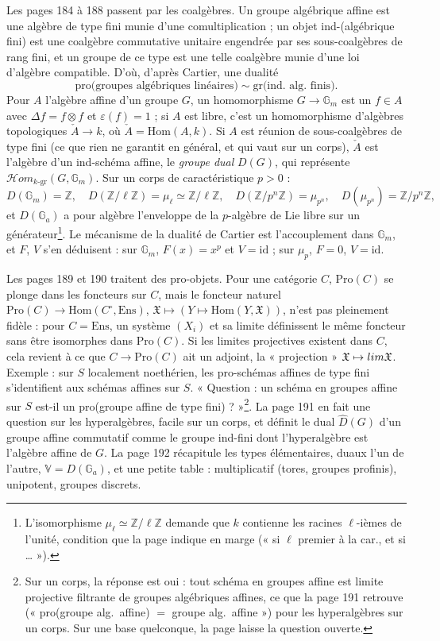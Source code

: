 \documentclass[11pt,a4paper]{article}
\begin{document}
Les pages 184 à 188 passent par les coalgèbres. Un groupe algébrique affine est
une algèbre de type fini munie d'une comultiplication ; un objet ind-(algébrique
fini) est une coalgèbre commutative unitaire engendrée par ses sous-coalgèbres de
rang fini, et un groupe de ce type est une telle coalgèbre munie d'une loi
d'algèbre compatible. D'où, d'après Cartier, une dualité
\[
\text{pro(groupes algébriques linéaires)} \sim \text{gr(ind.\ alg.\ finis)}.
\]
Pour $A$ l'algèbre affine d'un groupe $G$, un homomorphisme $G \to \mathbb{G}_m$ est un
$f \in A$ avec $\Delta f = f \otimes f$ et $\varepsilon(f) = 1$ ; si $A$ est libre,
c'est un homomorphisme d'algèbres topologiques $\check A \to k$, où $\check A =
\mathrm{Hom}(A, k)$. Si $A$ est réunion de sous-coalgèbres de type fini (ce que
rien ne garantit en général, et qui vaut sur un corps), $\check A$ est l'algèbre
d'un ind-schéma affine, le \emph{groupe dual} $D(G)$, qui représente
$\mathcal{H}om_{k\text{-gr}}(G, \mathbb{G}_m)$. Sur un corps de caractéristique
$p > 0$ :
\[
D(\mathbb{G}_m) = \mathbb{Z},\quad D(\mathbb{Z}/\ell\mathbb{Z}) = \mu_\ell \simeq
\mathbb{Z}/\ell\mathbb{Z},\quad D(\mathbb{Z}/p^n\mathbb{Z}) = \mu_{p^n},\quad
D(\mu_{p^n}) = \mathbb{Z}/p^n\mathbb{Z},
\]
et $D(\mathbb{G}_a)$ a pour algèbre l'enveloppe de la $p$-algèbre de Lie libre sur
un générateur\footnote{L'isomorphisme $\mu_\ell \simeq \mathbb{Z}/\ell\mathbb{Z}$
demande que $k$ contienne les racines $\ell$-ièmes de l'unité, condition que la
page indique en marge (« si $\ell$ premier à la car., et si … »).}. Le mécanisme de
la dualité de Cartier est l'accouplement dans $\mathbb{G}_m$, et $F$, $V$ s'en
déduisent : sur $\mathbb{G}_m$, $F(x) = x^p$ et $V = \mathrm{id}$ ; sur $\mu_p$,
$F = 0$, $V = \mathrm{id}$.

Les pages 189 et 190 traitent des pro-objets. Pour une catégorie $C$,
$\mathrm{Pro}(C)$ se plonge dans les foncteurs sur $C$, mais le foncteur naturel
$\mathrm{Pro}(C) \to \mathrm{Hom}(C^{\circ}, \mathrm{Ens})$, $\mathfrak{X} \mapsto
(Y \mapsto \mathrm{Hom}(Y, \mathfrak{X}))$, n'est pas pleinement fidèle : pour $C =
\mathrm{Ens}$, un système $(X_i)$ et sa limite définissent le même foncteur sans
être isomorphes dans $\mathrm{Pro}(C)$. Si les limites projectives existent dans
$C$, cela revient à ce que $C \to \mathrm{Pro}(C)$ ait un adjoint, la
« projection » $\mathfrak{X} \mapsto \varprojlim \mathfrak{X}$. Exemple : sur $S$
localement noethérien, les pro-schémas affines de type fini s'identifient aux
schémas affines sur $S$. « Question : un schéma en groupes affine sur $S$ est-il
un pro(groupe affine de type fini) ? »\footnote{Sur un corps, la réponse est oui :
tout schéma en groupes affine est limite projective filtrante de groupes
algébriques affines, ce que la page 191 retrouve (« pro(groupe alg.\ affine) $=$
groupe alg.\ affine ») pour les hyperalgèbres sur un corps. Sur une base
quelconque, la page laisse la question ouverte.}. La page 191 en fait une question
sur les hyperalgèbres, facile sur un corps, et définit le dual $\hat D(G)$ d'un
groupe affine commutatif comme le groupe ind-fini dont l'hyperalgèbre est
l'algèbre affine de $G$. La page 192 récapitule les types élémentaires, duaux
l'un de l'autre, $\mathbb{V} = D(\mathbb{G}_a)$, et une petite table :
multiplicatif (tores, groupes profinis), unipotent, groupes discrets.
\end{document}
